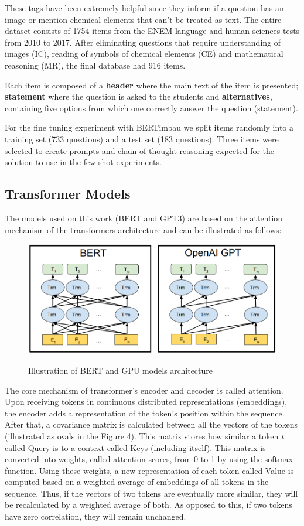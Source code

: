 \documentclass{article}
\begin{document}
These tags have been extremely helpful since they inform if a question has an image or mention chemical elements that can't be treated as text. The entire dataset consists of 1754 items from the ENEM language and human sciences tests from 2010 to 2017. After eliminating questions that require understanding of images (IC), reading of symbols of chemical elements (CE) and mathematical reasoning (MR), the final database had 916 items. 

Each item is composed of a \textbf{header} where the main text of the item is presented; \textbf{statement} where the question  is asked to the students and \textbf{alternatives}, containing five options from which one correctly answer the question (statement).

For the fine tuning experiment with BERTimbau we split items randomly into a training set (733 questions) and a test set (183 questions). Three items were selected to create prompts and chain of thought reasoning expected for the solution to use in the few-shot experiments. 


\subsection{Transformer Models}
The models used on this work (BERT and GPT3) are based on the attention mechanism of the transformers architecture and can be illustrated as follows:

\begin{figure}[h!]
    \centering
    \caption{Illustration of BERT and GPU models architecture}
    \includegraphics[width=0.75\columnwidth]{figures/4.png}
    \label{fig:3}
    \\
\end{figure}

The core mechanism of transformer's encoder and decoder is called attention.  Upon receiving tokens in continuous distributed representations (embeddings), the encoder adds a representation of the token's position within the sequence. After that, a covariance matrix is calculated between all the vectors of the tokens (illustrated as ovals in the Figure 4). This matrix stores how similar a token \textit{t} called Query is to a context called Keys (including itself). This matrix is converted into weights, called attention scores, from 0 to 1 by using the softmax function. Using these weights, a new representation of each token called Value is computed based on a weighted average of embeddings of all tokens in the sequence. Thus, if the vectors of two tokens are eventually more similar, they will be recalculated by a weighted average of both. As opposed to this, if two tokens have zero correlation, they will remain unchanged.
\end{document}
